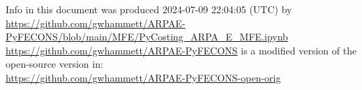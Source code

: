 {\footnotesize
\noindent
Info in this document was produced 2024-07-09 22:04:05 (UTC) by\\
\url{https://github.com/gwhammett/ARPAE-PyFECONS/blob/main/MFE/PyCosting_ARPA_E_MFE.ipynb}\\
\url{https://github.com/gwhammett/ARPAE-PyFECONS}
is a modified version of the open-source version in:\\
\url{https://github.com/gwhammett/ARPAE-PyFECONS-open-orig}
} %
